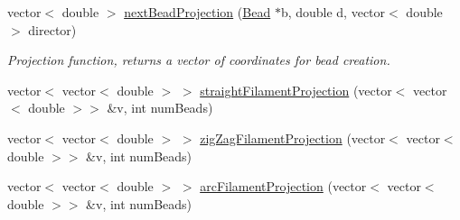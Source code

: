 {\bf }\par
\begin{DoxyCompactItemize}
\item 
vector$<$ double $>$ \hyperlink{classFilament_a96e6a97434a442014b199cd7623d2291}{next\+Bead\+Projection} (\hyperlink{classBead}{Bead} $\ast$b, double d, vector$<$ double $>$ director)
\begin{DoxyCompactList}\small\item\em Projection function, returns a vector of coordinates for bead creation. \end{DoxyCompactList}\item 
vector$<$ vector$<$ double $>$ $>$ \hyperlink{classFilament_ade0776033b4e56f8035eda23c03887fa}{straight\+Filament\+Projection} (vector$<$ vector$<$ double $>$$>$ \&v, int num\+Beads)
\item 
vector$<$ vector$<$ double $>$ $>$ \hyperlink{classFilament_a4809abeefb15e0009e246d4d4051ae7c}{zig\+Zag\+Filament\+Projection} (vector$<$ vector$<$ double $>$$>$ \&v, int num\+Beads)
\item 
vector$<$ vector$<$ double $>$ $>$ \hyperlink{classFilament_aa552f866d4c2db6e987fa0b56e65f060}{arc\+Filament\+Projection} (vector$<$ vector$<$ double $>$$>$ \&v, int num\+Beads)
\end{DoxyCompactItemize}

